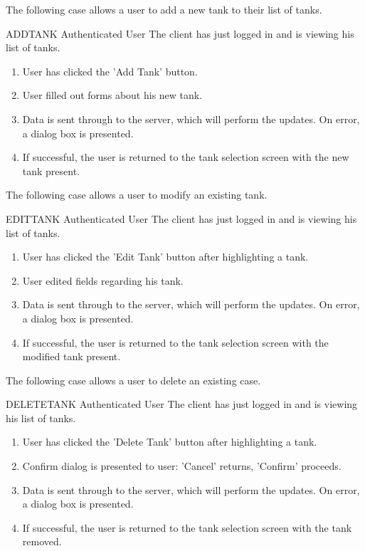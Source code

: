 The following case allows a user to add a new tank to their list of tanks.

\begin{usecase}
  {ADDTANK}
  {Authenticated User}
  {The client has just logged in and is viewing his list of tanks.}
\begin{enumerate}
\item User has clicked the 'Add Tank' button.
\item User filled out forms about his new tank.
\item Data is sent through to the server, which will perform the updates. On error, a dialog box is presented.
\item If successful, the user is returned to the tank selection screen with the new tank present.
\end{enumerate}
\end{usecase}

The following case allows a user to modify an existing tank.

\begin{usecase}
  {EDITTANK}
  {Authenticated User}
  {The client has just logged in and is viewing his list of tanks.}
\begin{enumerate}
\item User has clicked the 'Edit Tank' button after highlighting a tank.
\item User edited fields regarding his tank.
\item Data is sent through to the server, which will perform the updates. On error, a dialog box is presented.
\item If successful, the user is returned to the tank selection screen with the modified tank present.
\end{enumerate}
\end{usecase}

The following case allows a user to delete an existing case.

\begin{usecase}
  {DELETETANK}
  {Authenticated User}
  {The client has just logged in and is viewing his list of tanks.}
\begin{enumerate}
\item User has clicked the 'Delete Tank' button after highlighting a tank.
\item Confirm dialog is presented to user: 'Cancel' returns, 'Confirm' proceeds.
\item Data is sent through to the server, which will perform the updates. On error, a dialog box is presented.
\item If successful, the user is returned to the tank selection screen with the tank removed.
\end{enumerate}
\end{usecase}

